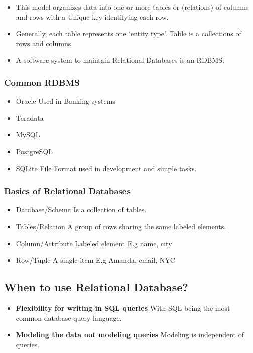\documentclass[
	paper=a4,%
	pagesize,%
	8pt, fleqn,%
	headings=small,%
	notitlepage,%
	parskip=never]%
	{scrreprt}
\begin{document}
\begin{multicols*}{3}
\begin{itemize}
\item This model organizes data into one or more tables or (relations) of columns and rows with a Unique key identifying each row.

\item Generally, each table represents one ‘entity type’. Table is a collections of rows and columns

\item A software system to maintain Relational Databases is an RDBMS.
\end{itemize}


\subsubsection{Common RDBMS}
\begin{itemize}
\item Oracle \hfill Used in Banking systems
\item Teradata
\item MySQL
\item PostgreSQL 
\item SQLite \hfill File Format used in development and simple tasks.
\end{itemize}

\subsubsection{Basics of Relational Databases}
\begin{itemize}
\item Database/Schema \hfill Is a collection of tables.
\item Tables/Relation \hfill A group of rows sharing the same labeled elements.
\item Column/Attribute \hfill Labeled element E.g name, city
\item Row/Tuple \hfill A single item E.g Amanda, email, NYC
\end{itemize}
\subsection{When to use Relational Database?}

\begin{itemize}
\item \textbf{Flexibility for writing in SQL queries} With SQL being the most common database query language.

\item \textbf{Modeling the data not modeling queries} Modeling is independent of queries.


\end{itemize}
\end{multicols*}
\end{document}
